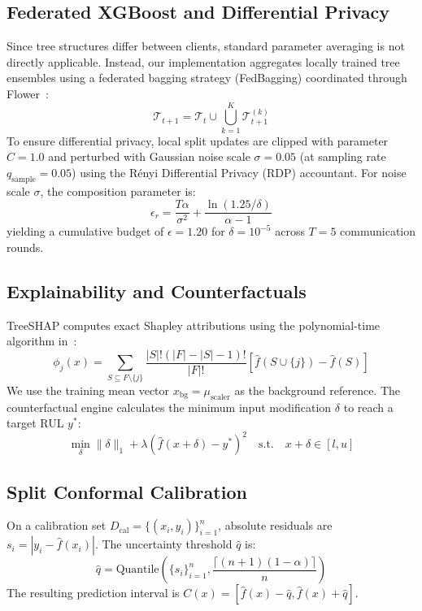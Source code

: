 \documentclass[letterpaper, 10 pt, conference]{ieeeconf}
\begin{document}
\subsection{Federated XGBoost and Differential Privacy}
Since tree structures differ between clients, standard parameter averaging is not directly applicable. Instead, our implementation aggregates locally trained tree ensembles using a federated bagging strategy (FedBagging) coordinated through Flower~\cite{flower}:
\begin{equation}
  \mathcal{T}_{t+1} = \mathcal{T}_t \cup \bigcup_{k=1}^K \mathcal{T}_{t+1}^{(k)}
\end{equation}
To ensure differential privacy, local split updates are clipped with parameter $C = 1.0$ and perturbed with Gaussian noise scale $\sigma = 0.05$ (at sampling rate $q_{\mathrm{sample}} = 0.05$) using the Rényi Differential Privacy (RDP) accountant. For noise scale $\sigma$, the composition parameter is:
\begin{equation}
  \epsilon_r = \frac{T \alpha}{\sigma^2} + \frac{\ln(1.25/\delta)}{\alpha-1}
\end{equation}
yielding a cumulative budget of $\epsilon = 1.20$ for $\delta = 10^{-5}$ across $T=5$ communication rounds.

\subsection{Explainability and Counterfactuals}
TreeSHAP computes exact Shapley attributions using the polynomial-time algorithm in~\cite{lundberg2020}:
\begin{equation}
  \phi_j(x) = \sum_{S \subseteq F \setminus \{j\}} \frac{|S|!(|F|-|S|-1)!}{|F|!} \left[ \hat{f}(S \cup \{j\}) - \hat{f}(S) \right]
\end{equation}
We use the training mean vector $x_{\text{bg}} = \mu_{\text{scaler}}$ as the background reference. The counterfactual engine calculates the minimum input modification $\delta$ to reach a target RUL $y^*$:
\begin{equation}
  \min_{\delta} \|\delta\|_1 + \lambda \left( \hat{f}(x+\delta) - y^* \right)^2 \quad \text{s.t.} \quad x + \delta \in [l, u]
\end{equation}

\subsection{Split Conformal Calibration}
On a calibration set $D_{\text{cal}} = \{(x_i, y_i)\}_{i=1}^n$, absolute residuals are $s_i = |y_i - \hat{f}(x_i)|$. The uncertainty threshold $\hat{q}$ is:
\begin{equation}
  \hat{q} = \text{Quantile}\left(\{s_i\}_{i=1}^n, \frac{\lceil (n+1)(1-\alpha) \rceil}{n}\right)
\end{equation}
The resulting prediction interval is $C(x) = [\hat{f}(x) - \hat{q}, \hat{f}(x) + \hat{q}]$.
\end{document}
